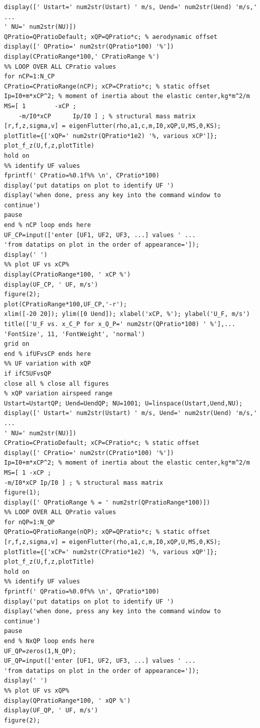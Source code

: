 \documentclass{article}
\begin{document}
\begin{lstlisting}[caption={Main analysis script for Homework 1.}, label={lst:main_script}]
display([' Ustart=' num2str(Ustart) ' m/s, Uend=' num2str(Uend) 'm/s,' ...
' NU=' num2str(NU)])
QPratio=QPratioDefault; xQP=QPratio*c; % aerodynamic offset
display([' QPratio=' num2str(QPratio*100) '%'])
display(CPratioRange*100,' CPratioRange %')
%% LOOP OVER ALL CPratio values
for nCP=1:N_CP
CPratio=CPratioRange(nCP); xCP=CPratio*c; % static offset
Ip=I0+m*xCP^2; % moment of inertia about the elastic center,kg*m^2/m
MS=[ 1        -xCP ;
    -m/I0*xCP      Ip/I0 ] ; % structural mass matrix
[r,f,z,sigma,v] = eigenFlutter(rho,a1,c,m,I0,xQP,U,MS,0,KS);
plotTitle={['xQP=' num2str(QPratio*1e2) '%, various xCP']};
plot_f_z(U,f,z,plotTitle)
hold on
%% identify UF values
fprintf(' CPratio=%0.1f%% \n', CPratio*100)
display('put datatips on plot to identify UF ')
display('when done, press any key into the command window to continue')
pause
end % nCP loop ends here
UF_CP=input(['enter [UF1, UF2, UF3, ...] values ' ...
'from datatips on plot in the order of appearance=']);
display(' ')
%% plot UF vs xCP%
display(CPratioRange*100, ' xCP %')
display(UF_CP, ' UF, m/s')
figure(2);
plot(CPratioRange*100,UF_CP,'-r');
xlim([-20 20]); ylim([0 Uend]); xlabel('xCP, %'); ylabel('U_F, m/s')
title(['U_F vs. x_C_P for x_Q_P=' num2str(QPratio*100) ' %'],...
'FontSize', 11, 'FontWeight', 'normal')
grid on
end % ifUFvsCP ends here
%% UF variation with xQP
if ifC5UFvsQP
close all % close all figures
% xQP variation airspeed range
Ustart=UstartQP; Uend=UendQP; NU=1001; U=linspace(Ustart,Uend,NU);
display([' Ustart=' num2str(Ustart) ' m/s, Uend=' num2str(Uend) 'm/s,' ...
' NU=' num2str(NU)])
CPratio=CPratioDefault; xCP=CPratio*c; % static offset
display([' CPratio=' num2str(CPratio*100) '%'])
Ip=I0+m*xCP^2; % moment of inertia about the elastic center,kg*m^2/m
MS=[ 1 -xCP ;
-m/I0*xCP Ip/I0 ] ; % structural mass matrix
figure(1);
display([' QPratioRange % = ' num2str(QPratioRange*100)])
%% LOOP OVER ALL QPratio values
for nQP=1:N_QP
QPratio=QPratioRange(nQP); xQP=QPratio*c; % static offset
[r,f,z,sigma,v] = eigenFlutter(rho,a1,c,m,I0,xQP,U,MS,0,KS);
plotTitle={['xCP=' num2str(CPratio*1e2) '%, various xQP']};
plot_f_z(U,f,z,plotTitle)
hold on
%% identify UF values
fprintf(' QPratio=%0.0f%% \n', QPratio*100)
display('put datatips on plot to identify UF ')
display('when done, press any key into the command window to continue')
pause
end % NxQP loop ends here
UF_QP=zeros(1,N_QP);
UF_QP=input(['enter [UF1, UF2, UF3, ...] values ' ...
'from datatips on plot in the order of appearance=']);
display(' ')
%% plot UF vs xQP%
display(QPratioRange*100, ' xQP %')
display(UF_QP, ' UF, m/s')
figure(2);

\end{lstlisting}
\end{document}
